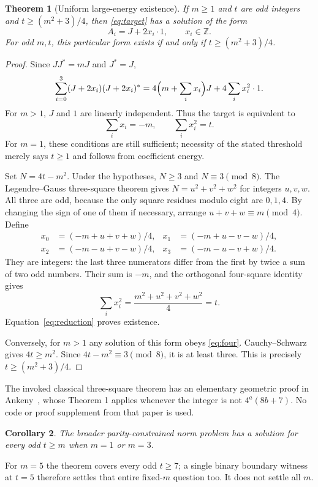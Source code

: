 \documentclass[11pt]{article}
\newtheorem{theorem}{Theorem}
\newtheorem{corollary}[theorem]{Corollary}
\newcommand{\Z}{\mathbb Z}
\begin{document}
\begin{theorem}[Uniform large-energy existence]\label{thm:main}
If $m\ge1$ and $t$ are odd integers and $t\ge(m^2+3)/4$, then
\eqref{eq:target} has a solution of the form
\[
 A_i=J+2x_i\cdot1,\qquad x_i\in\Z.
\]
For odd $m,t$, this particular form exists if and only if
$t\ge(m^2+3)/4$.
\end{theorem}
\begin{proof}
Since $JJ^*=mJ$ and $J^*=J$,
\begin{equation}\label{eq:reduction}
 \sum_{i=0}^3(J+2x_i)(J+2x_i)^*
 =4\Bigl(m+\sum_i x_i\Bigr)J+4\sum_i x_i^2\cdot1.
\end{equation}
For $m>1$, $J$ and $1$ are linearly independent. Thus the target is
equivalent to
\begin{equation}\label{eq:four}
 \sum_i x_i=-m,\qquad \sum_i x_i^2=t.
\end{equation}
For $m=1$, these conditions are still sufficient; necessity of the
stated threshold merely says $t\ge1$ and follows from coefficient energy.

Set $N=4t-m^2$. Under the hypotheses, $N\ge3$ and $N\equiv3\pmod8$.
The Legendre--Gauss three-square theorem gives
$N=u^2+v^2+w^2$ for integers $u,v,w$. All three are odd, because the
only square residues modulo eight are $0,1,4$. By changing the sign of
one of them if necessary, arrange
$u+v+w\equiv m\pmod4$. Define
\begin{align*}
 x_0&=(-m+u+v+w)/4,& x_1&=(-m+u-v-w)/4,\\
 x_2&=(-m-u+v-w)/4,& x_3&=(-m-u-v+w)/4.
\end{align*}
They are integers: the last three numerators differ from the first by
twice a sum of two odd numbers. Their sum is $-m$, and the orthogonal
four-square identity gives
\[
 \sum_i x_i^2=\frac{m^2+u^2+v^2+w^2}{4}=t.
\]
Equation~\eqref{eq:reduction} proves existence.

Conversely, for $m>1$ any solution of this form obeys
\eqref{eq:four}. Cauchy--Schwarz gives $4t\ge m^2$. Since
$4t-m^2\equiv3\pmod8$, it is at least three. This is precisely
$t\ge(m^2+3)/4$.
\end{proof}

The invoked classical three-square theorem has an elementary geometric
proof in Ankeny~\cite{Ankeny}, whose Theorem 1 applies whenever the
integer is not $4^a(8b+7)$. No code or proof supplement from that paper
is used.

\begin{corollary}
The broader parity-constrained norm problem has a solution for every
odd $t\ge m$ when $m=1$ or $m=3$.
\end{corollary}
For $m=5$ the theorem covers every odd $t\ge7$; a single binary boundary
witness at $t=5$ therefore settles that entire fixed-$m$ question too.
It does not settle all $m$.
\end{document}
